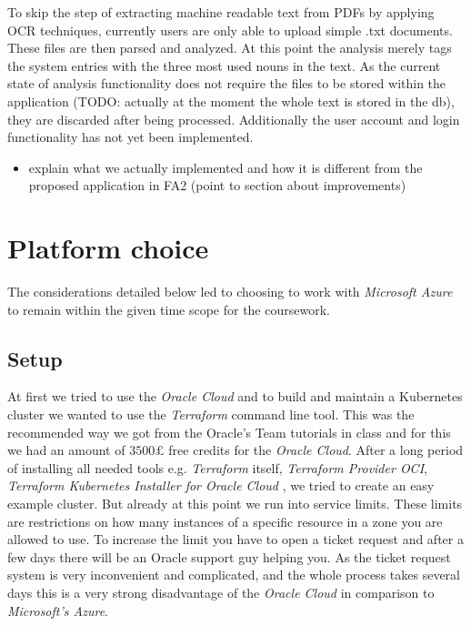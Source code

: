 \documentclass[conference]{IEEEtran}
\begin{document}
To skip the step of extracting machine readable text from PDFs by applying OCR techniques, currently users are only able to upload simple .txt documents. These files are then parsed and analyzed. At this point the analysis merely tags the system entries with the three most used nouns in the text. As the current state of analysis functionality does not require the files to be stored within the application (TODO: actually at the moment the whole text is stored in the db), they are discarded after being processed. Additionally the user account and login functionality has not yet been implemented.

\begin{itemize}
	\item explain what we actually implemented and how it is different from the proposed application in FA2 (point to section about improvements)
\end{itemize}

\section{Platform choice}
\label{sec:platform-choice}
The considerations detailed below led to choosing to work with \textit{Microsoft Azure} to remain within the given time scope for the coursework.

\subsection{Setup}
\label{subsec:setup}
At first we tried to use the \textit{Oracle Cloud} and to build and maintain a Kubernetes cluster we wanted to use the \textit{Terraform} command line tool. This was the recommended way we got from the Oracle's Team tutorials in class and for this we had an amount of $3500£$ free credits for the \textit{Oracle Cloud}.
After a long period of installing all needed tools e.g. \textit{Terraform} itself, \textit{Terraform Provider OCI}\cite{TerraformProviderOCI}, \textit{Terraform Kubernetes Installer for Oracle Cloud} \cite{TerrafromK8sInstaller}, we tried to create an easy example cluster.
But already at this point we run into service limits. These limits are restrictions on how many instances of a specific resource in a zone you are allowed to use. To increase the limit you have to open a ticket request and after a few days there will be an Oracle support guy helping you. As the ticket request system is very inconvenient and complicated, and the whole process takes several days this is a very strong
disadvantage of the \textit{Oracle Cloud} in comparison to \textit{Microsoft's Azure}.
\end{document}
